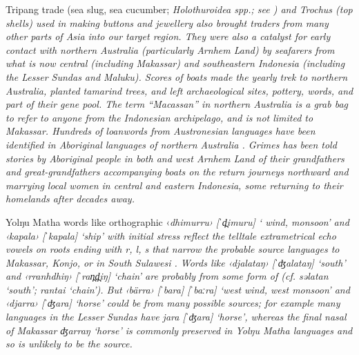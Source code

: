 Tripang trade (sea slug,
sea cucumber; \it{Holothuroidea spp}.; see )
and \it{Trochus} (top shells) used in making buttons
and jewellery also brought traders from many other parts of Asia into our target region.
They were also a catalyst for early contact with northern Australia (particularly
Arnhem Land) by seafarers from what is now central (including Makassar)
and southeastern Indonesia (including the Lesser Sundas and Maluku).
Scores of boats made the yearly trek to northern Australia,
planted tamarind trees, and left archaeological sites,
pottery, words, and part of their gene pool.
The term “Macassan” in northern Australia is a grab bag to refer to anyone from the
Indonesian archipelago, and is not limited to Makassar.
Hundreds of loanwords from Austronesian languages have been identified in Aboriginal
languages of northern Australia \citep{WalkerZorc1981,Evans1992}.
Grimes has been told stories by Aboriginal people in both 
and west Arnhem Land of their grandfathers
and great-grandfathers accompanying boats on the return journeys northward
and marrying local women in central
and eastern Indonesia, some returning to their homelands after decades away.

Yolŋu Matha words like orthographic ‹\it{dhimurru}› [ˈd̪imuru] ‘ wind,
 monsoon’ and ‹kapala› [ˈkapala] ‘ship’ with initial stress reflect the
telltale extrametrical echo vowels on roots ending with \it{r,
l, s} that narrow the probable source languages to Makassar,
Konjo, or  in South Sulawesi \citep[96]{GrimesGrimes1987}.
Words like ‹djalataŋ› [ˈʤalataŋ] ‘south’
and ‹rranhdhiŋ› [ˈran̪d̪iŋ] ‘chain’ are probably from some form of  (cf.
 \it{səlatan} ‘south’; \it{rantai} ‘chain’).
But ‹bärra› [ˈbara] {\tl} [ˈbaːra] ‘west wind,
west monsoon’ and ‹djarra› [ˈʤara] ‘horse’ could be from many possible sources;
for example many languages in the Lesser Sundas have \it{jara} [ˈʤara] ‘horse’,
whereas the final nasal of Makassar \it{ʤarraŋ} ‘horse’ is commonly preserved in
Yolŋu Matha languages and so is unlikely to be the source.


